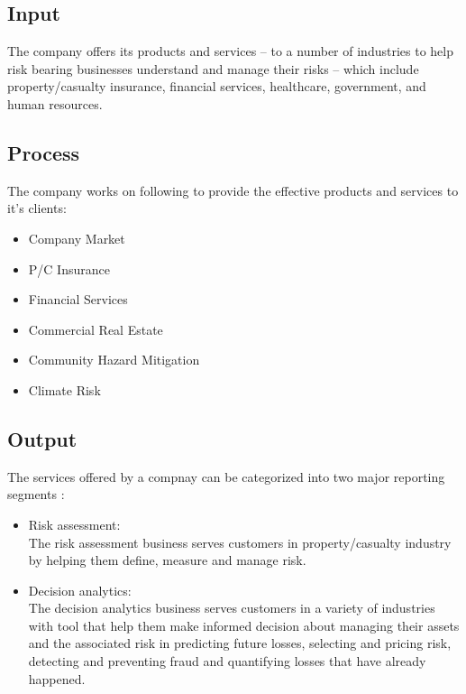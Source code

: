 \subsection{Input}
The company offers its products and services – to a number of industries to help risk bearing businesses
understand and manage their risks – which include property/casualty insurance, financial services, healthcare,
government, and human resources.
\subsection{Process}
The company works on following to provide the effective products and services to it's clients:
\begin{itemize}
\item Company Market
\item P/C Insurance
\item Financial Services
\item Commercial Real Estate
\item Community Hazard Mitigation
\item Climate Risk
\end{itemize}
\subsection{Output}
The services offered by a compnay can be categorized into two major reporting segments :
\begin{itemize}
\item Risk assessment:\\The risk assessment business serves customers in property/casualty industry by helping them define,
measure and manage risk.  
\item Decision analytics:\\ The decision analytics business serves customers in a variety of industries with tool
that help them make informed decision about managing their assets and the associated risk in predicting future
losses, selecting and pricing risk, detecting and preventing fraud and quantifying losses that have already
happened.

\end{itemize}
\cleardoublepage
